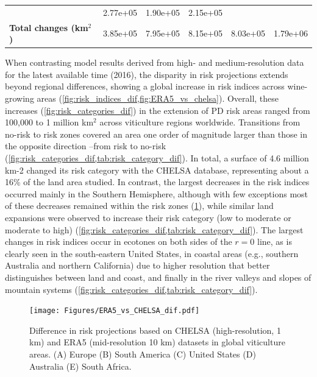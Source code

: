 \begin{table}[H]
{\begin{tabular}{lccccc}
                                                 & 2.77e+05
                                                 & 1.90e+05
                                                 & 2.15e+05
            \\
            \textbf{Total changes (km$^2$)}      & 3.85e+05
                                                 & 7.95e+05
                                                 & 8.15e+05
                                                 & 8.03e+05
                                                 & 1.79e+06
            \\ \hline
        \end{tabular}
    }
\end{table}

When contrasting model results derived from high- and medium-resolution
data for the latest available time (2016), the disparity in risk projections
extends beyond regional differences, showing a global increase in risk indices
across wine-growing areas (\cref{fig:risk_indices_dif,fig:ERA5_vs_chelsa}).
Overall, these increases
(\cref{fig:risk_categories_dif}) in the extension of PD risk areas ranged from
100,000 to 1 million km$^2$ across viticulture regions worldwide. Transitions
from no-risk to risk zones covered an area one order of magnitude larger than
those in the opposite direction --from risk to no-risk
(\cref{fig:risk_categories_dif,tab:risk_category_dif}). In total, a surface of
4.6 million km-2 changed its risk category with the CHELSA database,
representing about a 16\% of the land area studied. In contrast, the largest
decreases in the risk indices occurred mainly in the Southern Hemisphere,
although with few exceptions most of these decreases remained within the risk
zones (\cref{fig:risk_indices_dif}), while similar land expansions were
observed to  increase their risk category (low to moderate or moderate to high)
(\cref{fig:risk_categories_dif,tab:risk_category_dif}). The largest changes in
risk indices occur in ecotones on both sides of the $r=0$ line, as is clearly
seen in the south-eastern United States, in coastal areas (e.g., southern
Australia and northern California) due to higher resolution that better
distinguishes between land and coast, and finally in the river valleys and
slopes of mountain systems
(\cref{fig:risk_categories_dif,tab:risk_category_dif}).

\begin{figure}[H]
    \centering
    \texttt{[image: Figures/ERA5\_vs\_CHELSA\_dif.pdf]}
    \caption{Difference in risk projections based on CHELSA
        (high-resolution, 1 km) and ERA5 (mid-resolution 10 km) datasets in
        global
        viticulture areas. (A) Europe (B) South America (C) United States (D)
        Australia
        (E) South Africa.}
    \label{fig:risk_indices_dif}
\end{figure}

